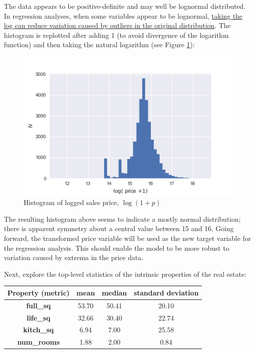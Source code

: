 \documentclass[12pt]{article}
\theoremstyle{plain} %
\theoremstyle{definition} %
\theoremstyle{remark} %
\begin{document}
The data appears to be positive-definite and may well be lognormal distributed.  In regression analyses, when some variables appear to be lognormal, \href{https://www.analyticsvidhya.com/blog/2016/01/guide-data-exploration/#four}{taking the log can reduce variation caused by outliers in the original distribution}.  The histogram is replotted after adding 1 (to avoid divergence of the logarithm function) and then taking the natural logarithm (see Figure \ref{fig:two}):

\begin{figure}[h!]
\begin{center}
\includegraphics[width=12cm]{./output_images/price_doc_log_hist.png}
\caption{Histogram of logged sales price, $\log(1+p)$}
\label{fig:two}
\end{center}
\end{figure}

The resulting histogram above seems to indicate a mostly normal distribution; there is apparent symmetry about a central value between 15 and 16.  Going forward, the transformed price variable will be used as the new target variable for the regression analysis. This should enable the model to be more robust to variation caused by extrema in the price data.

Next, explore the top-level statistics of the intrinsic properties of the real estate:
\begin{center}
\begin{tabular}{c | c | c | c }
\hline
Property (metric) & mean & median & standard deviation \\ \hline
\textbf{full\_sq} & 53.70 & 50.41 &  20.10 \\ \hline
\textbf{life\_sq} & 32.66 & 30.40 &  22.74 \\ \hline
\textbf{kitch\_sq} & 6.94 & 7.00 &  25.58 \\ \hline
\textbf{num\_rooms} & 1.88 & 2.00 &  0.84 \\ \hline
\end{tabular}
\label{tbl:one}
\end{center}
\end{document}
